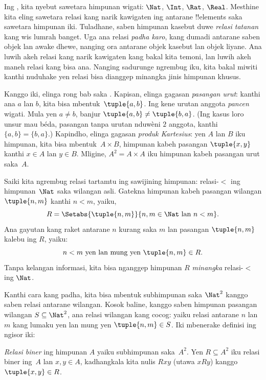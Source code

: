 \documentclass[../../../include/open-logic-section]{subfiles}
\begin{document}

\begin{explain}
Ing , kita nyebut sawetara himpunan
wigati: $\Nat$, $\Int$, $\Rat$, $\Real$. Mesthine kita eling
sawetara relasi kang narik kawigaten ing antarane !!{element}s
saka sawetara himpunan iki. Tuladhane, saben himpunan kasebut
duwe \emph{relasi tatanan} kang wis lumrah banget.
Uga ana relasi \emph{padha karo}, kang dumadi antarane saben objek
lan awake dhewe, nanging ora antarane objek kasebut lan objek liyane.
Ana luwih akeh relasi kang narik kawigaten kang bakal kita temoni,
lan luwih akeh maneh relasi kang bisa ana. Nanging sadurunge
ngrembug iku, kita bakal miwiti kanthi nuduhake yen relasi bisa
dianggep minangka jinis himpunan khusus.

Kanggo iki, elinga rong bab saka .
Kapisan, elinga gagasan \emph{pasangan urut}: kanthi ana $a$ lan $b$,
kita bisa mbentuk~$\tuple{a, b}$. Ing kene urutan anggota
\emph{pancen} wigati. Mula yen $a \neq b$,
banjur $\tuple{a, b} \neq \tuple{b, a}$.
(Ing kasus loro unsur mau béda, pasangan tanpa urutan nduwèni
$2$ anggota, kanthi $\{a, b\}=\{b, a\}$.)
Kapindho, elinga gagasan \emph{produk Kartesius}:
yen $A$ lan $B$ iku himpunan, kita bisa mbentuk~$A \times B$,
himpunan kabeh pasangan $\tuple{x, y}$ kanthi $x \in A$
lan $y \in B$. Mligine, $A^{2}= A \times A$ iku
himpunan kabeh pasangan urut saka~$A$.

Saiki kita ngrembug relasi tartamtu ing sawijining himpunan:
relasi-$<$ ing himpunan~$\Nat$ saka wilangan asli.
Gatekna himpunan kabeh pasangan wilangan $\tuple{n, m}$
kanthi $n<m$, yaiku,
\[
  R=\Setabs{\tuple{n, m}}{n, m \in \Nat \text{ lan } n<m}.
\]
Ana gayutan kang raket antarane $n$ kurang saka $m$ lan
pasangan $\tuple{n, m}$ kalebu ing $R$, yaiku:
\[
      n<m\text{ yen lan mung yen }\tuple{n, m} \in R.
\]
Tanpa kelangan informasi, kita bisa nganggep himpunan $R$
\emph{minangka} relasi-$<$ ing $\Nat$.

Kanthi cara kang padha, kita bisa mbentuk subhimpunan saka
$\Nat^{2}$ kanggo saben relasi antarane wilangan.
Kosok baline, kanggo saben himpunan pasangan wilangan
$S \subseteq \Nat^{2}$, ana relasi wilangan kang cocog:
yaiku relasi antarane $n$ lan $m$ kang lumaku yen lan mung yen
$\tuple{n, m} \in S$. Iki mbenerake definisi ing ngisor iki:
\end{explain}

\begin{defn}
\emph{Relasi biner} ing himpunan $A$ yaiku subhimpunan
saka~$A^{2}$. Yen $R\subseteq A^{2}$ iku relasi biner
ing~$A$ lan $x, y \in A$, kadhangkala kita nulis
$Rxy$ (utawa $xRy$) kanggo $\tuple{x, y} \in R$.
\end{defn}
\end{document}
